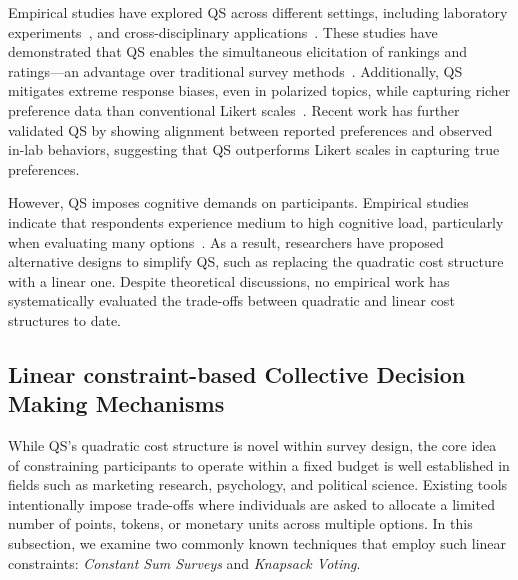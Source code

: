 Empirical studies have explored QS across different settings, including laboratory experiments~\cite{chengCanShowWhat2021,quarfoot2017quadratic}, and cross-disciplinary applications~\cite{cavaille2024cares, hollandDistributiveImpactsSupport2022,naylor2017first}. These studies have demonstrated that QS enables the simultaneous elicitation of rankings and ratings---an advantage over traditional survey methods~\cite{chengCanShowWhat2021}. Additionally, QS mitigates extreme response biases, even in polarized topics, while capturing richer preference data than conventional Likert scales~\cite{quarfoot2017quadratic, cavaille2024cares, chengCanShowWhat2021, naylor2017first}. Recent work has further validated QS by showing alignment between reported preferences and observed in-lab behaviors, suggesting that QS outperforms Likert scales in capturing true preferences.

However, QS imposes cognitive demands on participants. Empirical studies indicate that respondents experience medium to high cognitive load, particularly when evaluating many options~\cite{cavaille2024cares, chengOrganizeThenVote2025}. As a result, researchers have proposed alternative designs to simplify QS, such as replacing the quadratic cost structure with a linear one. Despite theoretical discussions, no empirical work has systematically evaluated the trade-offs between quadratic and linear cost structures to date.

\subsection{Linear constraint-based Collective Decision Making Mechanisms}
\label{sec:related_works_force_choice}
While QS's quadratic cost structure is novel within survey design, the core idea of constraining participants to operate within a fixed budget is well established in fields such as marketing research, psychology, and political science. Existing tools intentionally impose trade-offs where individuals are asked to allocate a limited number of points, tokens, or monetary units across multiple options. In this subsection, we examine two commonly known techniques that employ such linear constraints: \textit{Constant Sum Surveys} and \textit{Knapsack Voting}.

